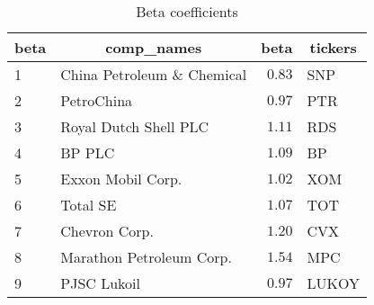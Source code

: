 \begin{table}[!tbp]
\caption{Beta coefficients\label{beta}} 
\begin{center}
\begin{tabular}{llrl}
\hline\hline
\multicolumn{1}{l}{beta}&\multicolumn{1}{c}{comp_names}&\multicolumn{1}{c}{beta}&\multicolumn{1}{c}{tickers}\tabularnewline
\hline
1&China Petroleum \& Chemical&$0.83$&SNP\tabularnewline
2&PetroChina&$0.97$&PTR\tabularnewline
3&Royal Dutch Shell PLC&$1.11$&RDS\tabularnewline
4&BP PLC&$1.09$&BP\tabularnewline
5&Exxon Mobil Corp.&$1.02$&XOM\tabularnewline
6&Total SE&$1.07$&TOT\tabularnewline
7&Chevron Corp.&$1.20$&CVX\tabularnewline
8&Marathon Petroleum Corp.&$1.54$&MPC\tabularnewline
9&PJSC Lukoil&$0.97$&LUKOY\tabularnewline
\hline
\end{tabular}\end{center}
\end{table}
